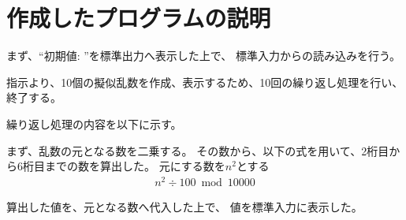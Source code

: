 

\section{作成したプログラムの説明}
まず、``初期値: ''を標準出力へ表示した上で、
標準入力からの読み込みを行う。

指示より、10個の擬似乱数を作成、表示するため、10回の繰り返し処理を行い、終了する。

繰り返し処理の内容を以下に示す。

まず、乱数の元となる数を二乗する。
その数から、以下の式を用いて、2桁目から6桁目までの数を算出した。
元にする数を$n^2$とする
\begin{align*}
    n^2 \div 100 \bmod 10000
\end{align*}

算出した値を、元となる数へ代入した上で、
値を標準入力に表示した。



